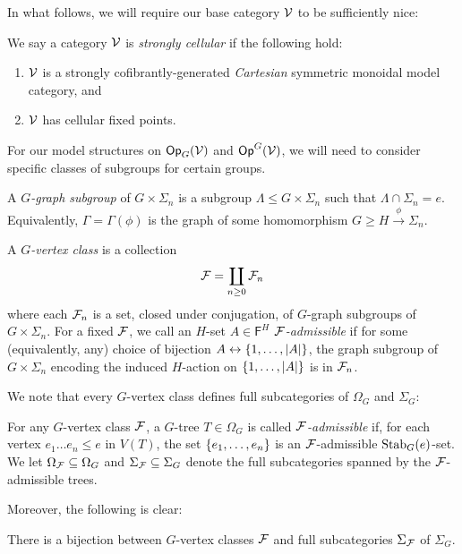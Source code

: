 \documentclass[a4paper,10pt]{article}%
\begin{document}
In what follows, we will require our base category $\mathcal V$ to be sufficiently nice:
\begin{definition}
  \label{STRONGLY_CELLULAR}
  We say a category $\mathcal V$ is \textit{strongly cellular} if the following hold: 
  \begin{enumerate} 
  \item $\mathcal V$ is a strongly cofibrantly-generated \textit{Cartesian} symmetric monoidal model category, and 
  \item $\mathcal V$ has cellular fixed points.
  \end{enumerate} 
\end{definition} 

For our model structures on $\mathsf{Op}_G(\mathcal V)$ and $\mathsf{Op}^G(\mathcal V)$, we will need to consider specific classes of subgroups for certain groups.

\begin{definition} 
  A \textit{$G$-graph subgroup} of $G\times \Sigma_n$ is a subgroup $\Lambda \leq G\times \Sigma_n$ such that $\Lambda \cap \Sigma_n = e$. Equivalently, $\Gamma = \Gamma(\phi)$ is the graph of some homomorphism $G \geq H \xrightarrow{\phi} \Sigma_n$.  
\end{definition} 

\begin{definition} 
  A \textit{$G$-vertex class} is a collection 
  \[ 
  \mathcal F = \coprod\limits_{n\geq 0}\mathcal F_n 
  \] 
  where each $\mathcal F_n$ is a set, closed under conjugation, of $G$-graph subgroups of $G\times \Sigma_n$. For a fixed $\mathcal F$, we call an $H$-set $A\in \mathsf F^H$ \textit{$\mathcal F$-admissible} if for some (equivalently, any) choice of bijection $A \leftrightarrow \left\{1,\ldots, |A|\right\}$, the graph subgroup of $G\times \Sigma_n$ encoding the induced $H$-action on $\left\{1,\ldots, |A|\right\}$ is in $\mathcal F_n$.  
\end{definition} 

We note that every $G$-vertex class defines full subcategories of $\Omega_G$ and $\Sigma_G$:
\begin{definition}
  For any $G$-vertex class $\mathcal F$, a $G$-tree $T\in \Omega_G$ is called \textit{$\mathcal F$-admissible} if, for each vertex $e_1\ldots e_n \leq e$ in $V(T)$, the set $\left\{e_1,\ldots, e_n\right\}$ is an $\mathcal F$-admissible $\mathrm{Stab}_G(e)$-set. We let $\Omega_{\mathcal F}\subseteq \Omega_G$ and $\Sigma_{\mathcal F}\subseteq \Sigma_G$ denote the full subcategories spanned by the $\mathcal F$-admissible trees. 
\end{definition}
Moreover, the following is clear:
\begin{lemma}
  There is a bijection between $G$-vertex classes $\mathcal F$ and full subcategories $\Sigma_{\mathcal F}$ of $\Sigma_G$.
\end{lemma}
\end{document}
